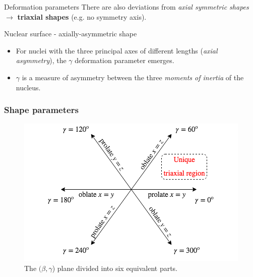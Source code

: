 \documentclass{beamer}
\begin{document}
\begin{frame}{Deformation parameters}
    There are also deviations from \emph{axial symmetric shapes} $\to$ \textbf{triaxial shapes} (e.g. no symmetry axis).
    \begin{block}{Nuclear surface - axially-asymmetric shape}
    \begin{itemize}
    \item For nuclei with the three principal axes of different lengths (\emph{axial asymmetry}), the $\gamma$ deformation parameter emerges.
    \item $\gamma$ is a measure of asymmetry between the three \textit{moments of inertia} of the nucleus.
    \end{itemize}
    \end{block}
\end{frame}


\begin{frame}
\frametitle{Shape parameters}
\begin{figure}
    \centering
    \includegraphics[scale=0.5]{figs/NuclearShapes1.png}
    \caption{The $(\beta,\gamma$) plane divided into six equivalent parts.}
    \label{fig:betagamma}
\end{figure}
\end{frame}
\end{document}
